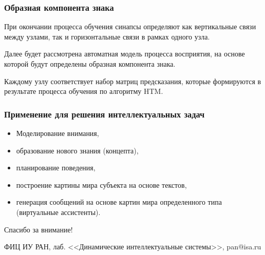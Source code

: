 \documentclass[default]{beamer}
\begin{document}
	\begin{frame}
		\frametitle{Образная компонента знака}
		
		При окончании процесса обучения синапсы определяют как вертикальные связи между узлами, так и горизонтальные связи в рамках одного узла.
		\par\bigskip
		Далее будет рассмотрена автоматная модель процесса восприятия, на основе которой будут определены образная компонента знака. 
		\par\bigskip
		Каждому узлу соответствует набор матриц предсказания, которые формируются в результате процесса обучения по алгоритму HTM.
	\end{frame}
			
	\begin{frame}
		\frametitle{Применение для решения интеллектуальных задач}
		
		\begin{itemize}
			\item Моделирование внимания,
			\item образование нового знания (концепта),
			\item планирование поведения,
			\item построение картины мира субъекта на основе текстов,
			\item генерация сообщений на основе картин мира определенного типа (виртуальные ассистенты).
		\end{itemize}
	\end{frame}

	\begin{frame}
		\centering
		\Huge
		Спасибо за внимание!
		\normalsize
		\par\bigskip
		\par\bigskip
		ФИЦ ИУ РАН, лаб. <<Динамические интеллектуальные системы>>, pan@isa.ru
	\end{frame}
														
%		
%				
	
\end{document}

